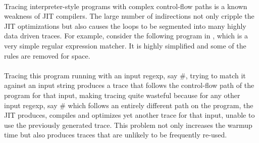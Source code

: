 
		\paragraph{}%
		Tracing interpreter-style programs with complex control-flow paths is
		a known weakness of JIT compilers. The large number of indirections
		not only cripple the JIT optimizations but also causes the loops to be
		segmented into many highly data driven traces. For
		example, consider the following program in , which
		is a very simple regular expression matcher. It is highly simplified
		and some of the rules are removed for space.

		\paragraph{}%
		Tracing this program running with an input regexp, say
		$\mathtt{\#}$, trying to match it against an
		input string produces a trace that follows the control-flow path of
		the program for that input, making tracing quite wasteful because for
		any other input regexp, say $\mathtt{\#}$ which
		follows an entirely different path on the program, the JIT produces,
		compiles and optimizes yet another trace for that input, unable to use
		the previously generated trace. This problem not only increases the
		warmup time but also produces traces that are unlikely to be
		frequently re-used.